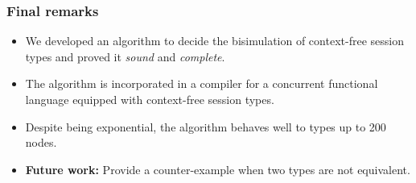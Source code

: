 \documentclass[10pt]{beamer}
\begin{document}
\begin{frame}
  \frametitle{Final remarks}

  \begin{itemize}
  \item We developed an algorithm to decide the bisimulation of context-free
    session types and proved it \emph{sound} and \emph{complete}.
  \item The algorithm is incorporated in a compiler for a concurrent functional
    language equipped with context-free session types.
    
  \item Despite being exponential, the algorithm behaves well to types up to 200 nodes.
  \item \textbf{Future work:} Provide a counter-example when two types are not equivalent.
  \end{itemize}
 \end{frame}




 
\end{document}
